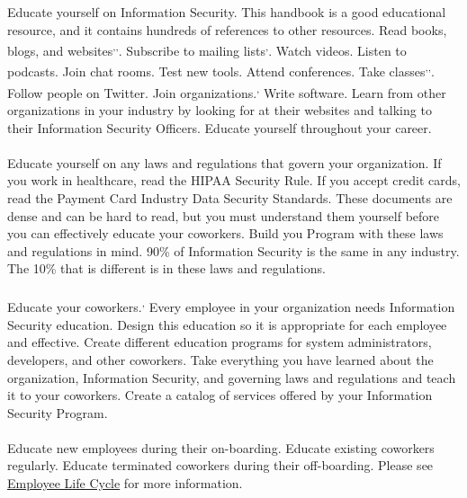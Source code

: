 Educate yourself on Information Security. This handbook is a good educational resource, and it contains hundreds of references to other resources. Read books, blogs, and websites\textsuperscript{,}\textsuperscript{,}. Subscribe to mailing lists\textsuperscript{,}. Watch videos. Listen to podcasts. Join chat rooms. Test new tools. Attend conferences. Take classes\textsuperscript{,}\textsuperscript{,}. Follow people on Twitter. Join organizations.\textsuperscript{,} Write software. Learn from other organizations in your industry  by looking for at their websites and talking to their Information Security Officers. Educate yourself throughout your career.\\\\
Educate yourself on any laws and regulations that govern your organization. If you work in healthcare, read the HIPAA Security Rule. If you accept credit cards, read the Payment Card Industry Data Security Standards. These documents are dense and can be hard to read, but you must understand them yourself before you can effectively educate your coworkers. Build you Program with these laws and regulations in mind. 90\% of Information Security is the same in any industry. The 10\% that is different is in these laws and regulations.\\\\
Educate your coworkers.\textsuperscript{,} Every employee in your organization needs Information Security education. Design this education so it is appropriate for each employee and effective. Create different education programs for system administrators, developers, and other coworkers. Take everything you have learned about the organization, Information Security, and governing laws and regulations and teach it to your coworkers. Create a catalog of services offered by your Information Security Program.\\\\
Educate new employees during their on-boarding. Educate existing coworkers regularly. Educate terminated coworkers during their off-boarding. Please see \hyperref[subsec:"Employee Life Cycle"]{Employee Life Cycle} for more information.\\\\
